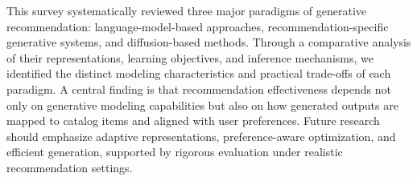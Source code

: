 \documentclass[sigconf,nonacm]{acmart}
\begin{document}
This survey systematically reviewed three major paradigms
of generative recommendation: language-model-based approaches,
recommendation-specific generative systems, and diffusion-based methods.
Through a comparative analysis of their representations,
learning objectives, and inference mechanisms, we identified
the distinct modeling characteristics and practical trade-offs
of each paradigm. A central finding is that recommendation
effectiveness depends not only on generative modeling
capabilities but also on how generated outputs are mapped
to catalog items and aligned with user preferences.
Future research should emphasize adaptive representations,
preference-aware optimization, and efficient generation,
supported by rigorous evaluation under realistic
recommendation settings.


\balance


\end{document}
